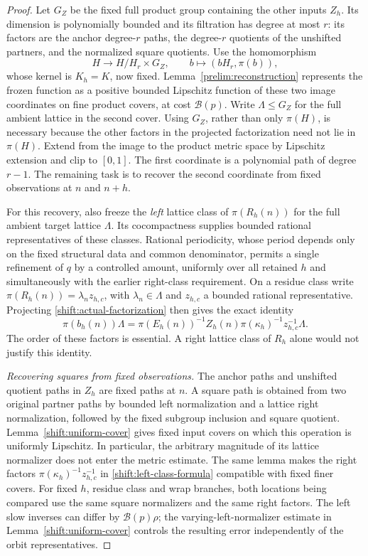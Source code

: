 \begin{proof}
Let $G_Z$ be the fixed full product group containing the other
inputs $Z_h$.  Its dimension is polynomially bounded and its
filtration has degree at most $r$: its factors are the anchor
degree-$r$ paths, the degree-$r$ quotients of the unshifted partners,
and the normalized square quotients.  Use the homomorphism
\[
 H\longrightarrow H/H_r\times G_Z,\qquad
 b\longmapsto (bH_r,\pi(b)),
\]
whose kernel is $K_h=K$, now fixed.
Lemma~\ref{prelim:reconstruction} represents the frozen function
as a positive bounded Lipschitz function of these two image
coordinates on fine product covers, at cost $\mathcal B(p)$.
Write $\Lambda\leq G_Z$ for the full ambient lattice in the second
cover.  Using $G_Z$, rather than only $\pi(H)$, is necessary because
the other factors in the projected factorization need not lie in
$\pi(H)$.  Extend from the image to the product metric space by
Lipschitz extension and clip to $[0,1]$.
The first coordinate is a polynomial path of degree $r-1$.
The remaining task is to recover the second coordinate from
fixed observations at $n$ and $n+h$.

For this recovery, also freeze the \emph{left} lattice class of
$\pi(R_h(n))$ for the full ambient target lattice $\Lambda$.
Its cocompactness supplies bounded rational representatives of
these classes.  Rational periodicity, whose period depends only on
the fixed structural data and common denominator, permits a single
refinement of $q$ by a controlled amount, uniformly over all retained
$h$ and simultaneously with the earlier right-class requirement.
On a residue class
write $\pi(R_h(n))=\lambda_n z_{h,c}$, with
$\lambda_n\in\Lambda$ and $z_{h,c}$ a bounded rational
representative.  Projecting \eqref{shift:actual-factorization}
then gives the exact identity
\begin{equation}\label{shift:left-class-formula}
 \pi(b_h(n))\Lambda
 =\pi(E_h(n))^{-1}Z_h(n)\pi(\kappa_h)^{-1}
 z_{h,c}^{-1}\Lambda.
\end{equation}
The order of these factors is essential.  A right lattice class
of $R_h$ alone would not justify this identity.

\emph{Recovering squares from fixed observations.}
The anchor paths and unshifted quotient paths in $Z_h$ are fixed
paths at $n$.  A square path is obtained from two original
partner paths by bounded left normalization and a lattice right
normalization, followed by the fixed subgroup inclusion and
square quotient.  Lemma~\ref{shift:uniform-cover} gives fixed
input covers on which this operation is uniformly Lipschitz.
In particular, the arbitrary magnitude of its lattice normalizer
does not enter the metric estimate.
The same lemma makes the right factors
$\pi(\kappa_h)^{-1}z_{h,c}^{-1}$ in
\eqref{shift:left-class-formula} compatible with fixed finer
covers.  For fixed $h$, residue class and wrap branches, both
locations being compared use the same square normalizers and the
same right factors.  The left slow inverses can differ by
$\mathcal B(p)\rho$; the varying-left-normalizer estimate in
Lemma~\ref{shift:uniform-cover} controls the resulting error
independently of the orbit representatives.


\end{proof}
